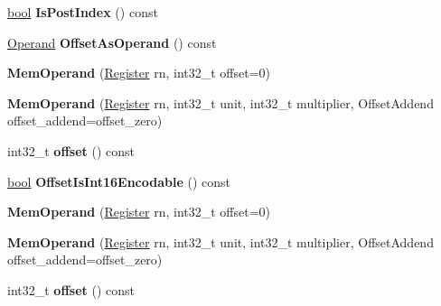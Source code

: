 \begin{DoxyCompactItemize}
\mbox{\hyperlink{classbool}{bool}} {\bfseries Is\+Post\+Index} () const
\item 
\mbox{\label{classv8_1_1internal_1_1MemOperand_a20e6ed12d1f178fafecf9a89e573ee35}} 
\mbox{\hyperlink{classv8_1_1internal_1_1Operand}{Operand}} {\bfseries Offset\+As\+Operand} () const
\item 
\mbox{\label{classv8_1_1internal_1_1MemOperand_a7edbeda729ce9248b7151164c72e41ef}} 
{\bfseries Mem\+Operand} (\mbox{\hyperlink{classv8_1_1internal_1_1Register}{Register}} rn, int32\+\_\+t offset=0)
\item 
\mbox{\label{classv8_1_1internal_1_1MemOperand_a5cd48c156f36f5795f1982b2ccb52740}} 
{\bfseries Mem\+Operand} (\mbox{\hyperlink{classv8_1_1internal_1_1Register}{Register}} rn, int32\+\_\+t unit, int32\+\_\+t multiplier, Offset\+Addend offset\+\_\+addend=offset\+\_\+zero)
\item 
\mbox{\label{classv8_1_1internal_1_1MemOperand_acf7eabec54a6bf88443b6f5e9746f7c6}} 
int32\+\_\+t {\bfseries offset} () const
\item 
\mbox{\label{classv8_1_1internal_1_1MemOperand_a016351742a376f0414a919173441163a}} 
\mbox{\hyperlink{classbool}{bool}} {\bfseries Offset\+Is\+Int16\+Encodable} () const
\item 
\mbox{\label{classv8_1_1internal_1_1MemOperand_a7edbeda729ce9248b7151164c72e41ef}} 
{\bfseries Mem\+Operand} (\mbox{\hyperlink{classv8_1_1internal_1_1Register}{Register}} rn, int32\+\_\+t offset=0)
\item 
\mbox{\label{classv8_1_1internal_1_1MemOperand_a5cd48c156f36f5795f1982b2ccb52740}} 
{\bfseries Mem\+Operand} (\mbox{\hyperlink{classv8_1_1internal_1_1Register}{Register}} rn, int32\+\_\+t unit, int32\+\_\+t multiplier, Offset\+Addend offset\+\_\+addend=offset\+\_\+zero)
\item 
\mbox{\label{classv8_1_1internal_1_1MemOperand_acf7eabec54a6bf88443b6f5e9746f7c6}} 
int32\+\_\+t {\bfseries offset} () const

\end{DoxyCompactItemize}
